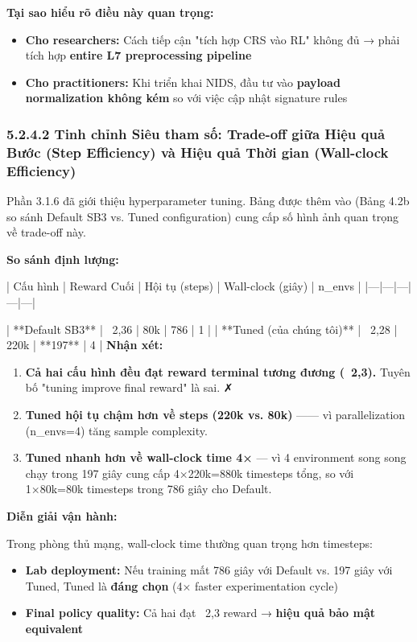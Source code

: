 \documentclass[12pt,a4paper,twoside]{report}
\begin{document}
{{{{{{{{{{{\textbf{Tại sao hiểu rõ điều này quan trọng:}

\begin{itemize}
\item \textbf{Cho researchers:} Cách tiếp cận "tích hợp CRS vào RL" không đủ → phải tích hợp \textbf{entire L7 preprocessing pipeline}
\item \textbf{Cho practitioners:} Khi triển khai NIDS, đầu tư vào \textbf{payload normalization không kém} so với việc cập nhật signature rules
\end{itemize}


\subsubsection{5.2.4.2 Tinh chỉnh Siêu tham số: Trade-off giữa Hiệu quả Bước (Step Efficiency) và Hiệu quả Thời gian (Wall-clock Efficiency)}

Phần 3.1.6 đã giới thiệu hyperparameter tuning. Bảng được thêm vào (Bảng 4.2b so sánh Default SB3 vs. Tuned configuration) cung cấp số hình ảnh quan trọng về trade-off này.

\textbf{So sánh định lượng:}

| Cấu hình | Reward Cuối | Hội tụ (steps) | Wall-clock (giây) | n_envs |
|---|---|---|---|---|

| **Default SB3** | ~2,36 | 80k | 786 | 1 |
| **Tuned (của chúng tôi)** | ~2,28 | 220k | **197** | 4 |
\textbf{Nhận xét:}
\begin{enumerate}
\item \textbf{Cả hai cấu hình đều đạt reward terminal tương đương (~2,3).} Tuyên bố "tuning improve final reward" là sai. ✗
\item \textbf{Tuned hội tụ chậm hơn về steps (220k vs. 80k)} —— vì parallelization (n_envs=4) tăng sample complexity.
\item \textbf{Tuned nhanh hơn về wall-clock time 4×} — vì 4 environment song song chạy trong 197 giây cung cấp 4×220k=880k timesteps tổng, so với 1×80k=80k timesteps trong 786 giây cho Default.
\end{enumerate}

\textbf{Diễn giải vận hành:}

Trong phòng thủ mạng, wall-clock time thường quan trọng hơn timesteps:
\begin{itemize}
\item \textbf{Lab deployment:} Nếu training mất 786 giây với Default vs. 197 giây với Tuned, Tuned là \textbf{đáng chọn} (4× faster experimentation cycle)
\item \textbf{Final policy quality:} Cả hai đạt ~2,3 reward → \textbf{hiệu quả bảo mật equivalent}
\end{itemize}

}}}}}}}}}}}
\end{document}
